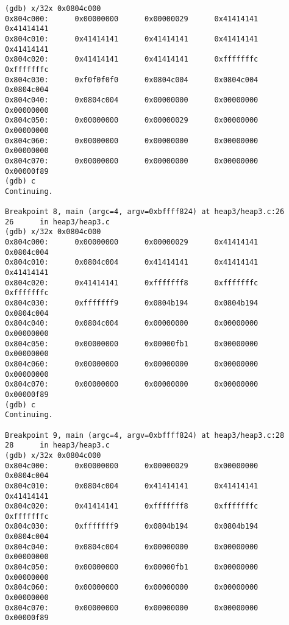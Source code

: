 \begin{lstlisting}
(gdb) x/32x 0x0804c000
0x804c000:      0x00000000      0x00000029      0x41414141      0x41414141
0x804c010:      0x41414141      0x41414141      0x41414141      0x41414141
0x804c020:      0x41414141      0x41414141      0xfffffffc      0xfffffffc
0x804c030:      0xf0f0f0f0      0x0804c004      0x0804c004      0x0804c004
0x804c040:      0x0804c004      0x00000000      0x00000000      0x00000000
0x804c050:      0x00000000      0x00000029      0x00000000      0x00000000
0x804c060:      0x00000000      0x00000000      0x00000000      0x00000000
0x804c070:      0x00000000      0x00000000      0x00000000      0x00000f89
(gdb) c
Continuing.

Breakpoint 8, main (argc=4, argv=0xbffff824) at heap3/heap3.c:26
26      in heap3/heap3.c
(gdb) x/32x 0x0804c000
0x804c000:      0x00000000      0x00000029      0x41414141      0x0804c004
0x804c010:      0x0804c004      0x41414141      0x41414141      0x41414141
0x804c020:      0x41414141      0xfffffff8      0xfffffffc      0xfffffffc
0x804c030:      0xfffffff9      0x0804b194      0x0804b194      0x0804c004
0x804c040:      0x0804c004      0x00000000      0x00000000      0x00000000
0x804c050:      0x00000000      0x00000fb1      0x00000000      0x00000000
0x804c060:      0x00000000      0x00000000      0x00000000      0x00000000
0x804c070:      0x00000000      0x00000000      0x00000000      0x00000f89
(gdb) c
Continuing.

Breakpoint 9, main (argc=4, argv=0xbffff824) at heap3/heap3.c:28
28      in heap3/heap3.c
(gdb) x/32x 0x0804c000
0x804c000:      0x00000000      0x00000029      0x00000000      0x0804c004
0x804c010:      0x0804c004      0x41414141      0x41414141      0x41414141
0x804c020:      0x41414141      0xfffffff8      0xfffffffc      0xfffffffc
0x804c030:      0xfffffff9      0x0804b194      0x0804b194      0x0804c004
0x804c040:      0x0804c004      0x00000000      0x00000000      0x00000000
0x804c050:      0x00000000      0x00000fb1      0x00000000      0x00000000
0x804c060:      0x00000000      0x00000000      0x00000000      0x00000000
0x804c070:      0x00000000      0x00000000      0x00000000      0x00000f89
\end{lstlisting}

